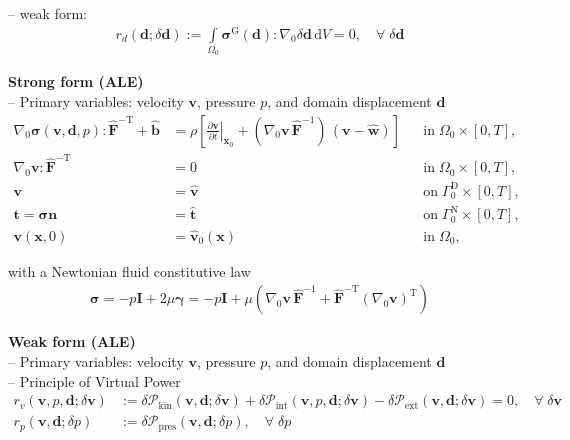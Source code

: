 \documentclass[a4paper,12pt]{report}
\newcommand{\bs}[1]{\boldsymbol{#1}}
\newcommand{\Om}{\mathit{\Omega}}
\newcommand{\Gm}{\mathit{\Gamma}}
\begin{document}
-- weak form:
\begin{equation}
\label{equation-ale-weak-form}
\begin{aligned}
r_{d}(\bs{d};\delta\bs{d}) := \int\limits_{\Om_0}\bs{\sigma}^{\mathrm{G}}(\bs{d}) : \nabla_{0}\delta\bs{d}\,\mathrm{d}V = 0, \quad \forall \; \delta\bs{d}
\end{aligned}
\end{equation}


\textbf{Strong form (ALE)}\\

-- Primary variables: velocity $\bs{v}$, pressure $p$, and domain displacement $\bs{d}$
\begin{equation}
\label{equation-fluid-ale-strong-form}
\begin{aligned}
\nabla_{0} \bs{\sigma}(\bs{v},\bs{d},p) : \widehat{\bs{F}}^{-\mathrm{T}} + \hat{\bs{b}} &= \rho\left[\left.\frac{\partial\bs{v}}{\partial t}\right|_{\bs{x}_{0}} + (\nabla_0\bs{v}\,\widehat{\bs{F}}^{-1})\,(\bs{v}-\widehat{\bs{w}})\right] &&\text{in} \; \mathit{\Om}_0 \times [0, T],\\
\nabla_{0}\bs{v} : \widehat{\bs{F}}^{-\mathrm{T}} &= 0 &&\text{in} \; \mathit{\Om}_0 \times [0, T],\\
\bs{v} &= \hat{\bs{v}} &&\text{on} \; \mathit{\Gm}_0^{\mathrm{D}} \times [0, T], \\
\bs{t} = \bs{\sigma}\bs{n} &= \hat{\bs{t}} &&\text{on} \; \mathit{\Gm}_0^{\mathrm{N}} \times [0, T], \\
\bs{v}(\bs{x},0) &= \hat{\bs{v}}_{0}(\bs{x}) &&\text{in} \; \mathit{\Om}_0,
\end{aligned}
\end{equation}

with a Newtonian fluid constitutive law
\begin{align}
\bs{\sigma} = -p \bs{I} + 2 \mu \bs{\gamma} = -p \bs{I} + \mu \left(\nabla_0 \bs{v}\,\widehat{\bs{F}}^{-1} + \widehat{\bs{F}}^{-\mathrm{T}}(\nabla_0 \bs{v})^{\mathrm{T}}\right)
\end{align}

\textbf{Weak form (ALE)}\\

-- Primary variables: velocity $\bs{v}$, pressure $p$, and domain displacement $\bs{d}$\\

-- Principle of Virtual Power
\begin{equation}
\label{equation-fluid-ale-weak-form}
\begin{aligned}
r_v(\bs{v},p,\bs{d};\delta\bs{v}) &:= \delta \mathcal{P}_{\mathrm{kin}}(\bs{v},\bs{d};\delta\bs{v}) + \delta \mathcal{P}_{\mathrm{int}}(\bs{v},p,\bs{d};\delta\bs{v}) - \delta \mathcal{P}_{\mathrm{ext}}(\bs{v},\bs{d};\delta\bs{v}) = 0, \quad \forall \; \delta\bs{v} \\
r_p(\bs{v},\bs{d};\delta p) &:= \delta \mathcal{P}_{\mathrm{pres}}(\bs{v},\bs{d};\delta p), \quad \forall \; \delta p
\end{aligned}
\end{equation}
\end{document}
